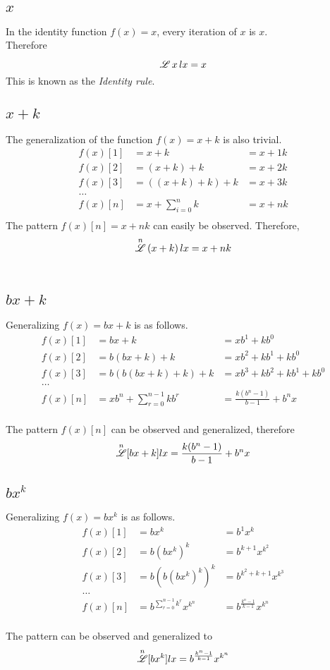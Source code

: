 \documentclass[12pt, letterpaper]{article}
\begin{document}
\subsection{$x$}
In the identity function \(f(x) = x\), every iteration of \(x\) is \(x\). 
\\
Therefore
$$\overset{}{\mathscr{L}} \, x \, lx = x$$
This is known as the \textit{Identity rule}.

\subsection{$x+k$}
The generalization of the function $f(x) = x+k$ is also trivial.
\begin{align*}
    f(x)[1] &= x + k             &= x + 1k \\
    f(x)[2] &= (x + k) + k       &= x + 2k \\
    f(x)[3] &= ((x + k) + k) + k &= x + 3k \\
       \dots \\
    f(x)[n] &= x + \sum_{i=0}^n k  &= x + nk \\
\end{align*}
The pattern $f(x)[n] = x + nk$ can easily be observed. Therefore,
$$\overset{n}{\mathscr{L}} \, (x+k) \, lx = x+nk$$
\\

\subsection{$bx+k$}
Generalizing {$f(x) = bx+k$} is as follows.
\begin{align*}
    f(x)[1] &= bx + k             &= xb^{1}+kb^{0} \\
    f(x)[2] &= b(bx + k) + k       &= xb^{2}+kb^{1}+kb^{0} \\
    f(x)[3] &= b(b(bx + k) + k) + k &= xb^{3} + kb^{2} + kb^{1} + kb^{0} \\
       \dots \\
    f(x)[n] &= xb^{n}+\sum_{r=0}^{n-1} kb^{r}  &= \frac{k(b^{n}-1)}{b-1}+b^{n}x
\end{align*}
\\
The pattern $f(x)[n]$ can be observed and generalized, therefore
$$\overset{n}{\mathscr{L}} [bx+k] lx = \frac{k(b^{n}-1)}{b-1}+b^{n}x$$

\subsection{$bx^k$}
Generalizing {$f(x) = bx^{k}$} is as follows.
\begin{align*}
    f(x)[1] &= bx^{k}             &= b^{1}x^{k} \\
    f(x)[2] &= b(bx^{k}) ^{k}       &= b^{k+1}x^{k^{2}} \\
    f(x)[3] &= b(b(bx^{k})^{k})^{k} &= b^{k^{2} + k + 1} x^{k^{3}} \\
       \dots \\
    f(x)[n] &= b^{\displaystyle \sum_{r=0}^{n-1} k^{r}} x^{k^{n}}  &= b^{\frac{k^{n}-1}{k-1}}x^{k^{n}}
\end{align*}
\\The pattern can be observed and generalized to
$$\overset{n}{\mathscr{L}} [bx^k] lx = b^{\frac{k^{n}-1}{k-1}}x^{k^{n}}$$
\end{document}
